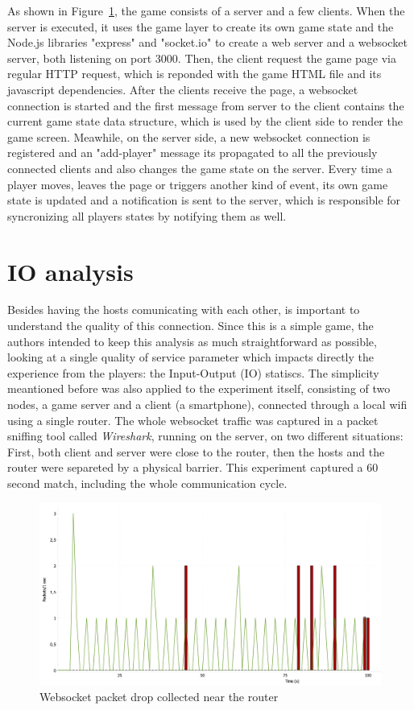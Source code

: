\documentclass[english]{sbrt}
\begin{document}
As shown in Figure~\ref{game-diagram}, the game consists of a server and a few clients. When the server is executed, it uses the game layer to create its own game state and the Node.js libraries "express" and "socket.io" to create a web server and a websocket server, both listening on port 3000.
Then, the client request the game page via regular HTTP request, which is reponded with the game HTML file and its javascript dependencies. After the clients receive the page, a websocket connection is started and the first message from server to the client contains the current
game state data structure, which is used by the client side to render the game screen. Meawhile, on the server side, a new websocket connection is registered and an "add-player" message its propagated to all the previously connected clients and also changes the game state on the server.
Every time a player moves, leaves the page or triggers another kind of event, its own game state is updated and a notification is sent to the server, which is responsible for syncronizing all players states by notifying them as well.

\section{\textbf{IO analysis}}

Besides having the hosts comunicating with each other, is important to understand the quality of this connection.
Since this is a simple game, the authors intended to keep this analysis as much straightforward as possible, looking at a 
single quality of service parameter which impacts directly the experience from the players: the Input-Output (IO) statiscs. The simplicity meantioned before was
also applied to the experiment itself, consisting of two nodes, a game server and a client (a smartphone), connected through a local wifi using a single router. The whole websocket
traffic was captured in a packet sniffing tool called \textit{Wireshark}, running on the server, on two different situations: First, both client and server were close to the router, then the hosts and the router
were separeted by a physical barrier. This experiment captured a 60 second match, including the whole communication cycle.

\begin{figure}[H]
  \centering
  \includegraphics[width=12cm]{websocket traffic hall.jpg}
  \caption{Websocket packet drop collected near the router}
  \label{game-diagram}
\end{figure}
\end{document}
